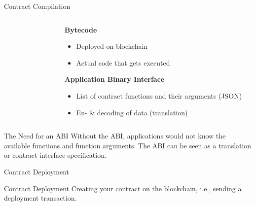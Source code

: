 \documentclass[]{beamer}
\begin{document}
\begin{frame}{Contract Compilation}

	\begin{columns}
		\begin{column}{0.6\textwidth}
			\begin{figure}[h!]
				\center
					
			\end{figure}\vspace{1em}
		\end{column}
		
		\begin{column}{0.5\textwidth}
			\textbf{Bytecode}
				\begin{itemize}
					\item Deployed on blockchain
					\item Actual code that gets executed
				\end{itemize}
		\vspace{1em}
			\textbf{Application Binary Interface}
				\begin{itemize}
					\item List of contract functions and their arguments (JSON)
					\item En- \& decoding of data (translation) 
				\end{itemize}
		\end{column}
	\end{columns}

	\begin{keytakeaway}{The Need for an ABI}
		 Without the ABI, applications would not know the available functions and function arguments. The ABI can be seen as a translation or contract interface specification.
	\end{keytakeaway}		

\end{frame}


\begin{frame}{Contract Deployment}
		
	\begin{keytakeaway}{Contract Deployment}
		Creating your contract on the blockchain, i.e., sending a deployment transaction.
	\end{keytakeaway}
	
	\vspace{1.5em}
\end{frame}
\end{document}
